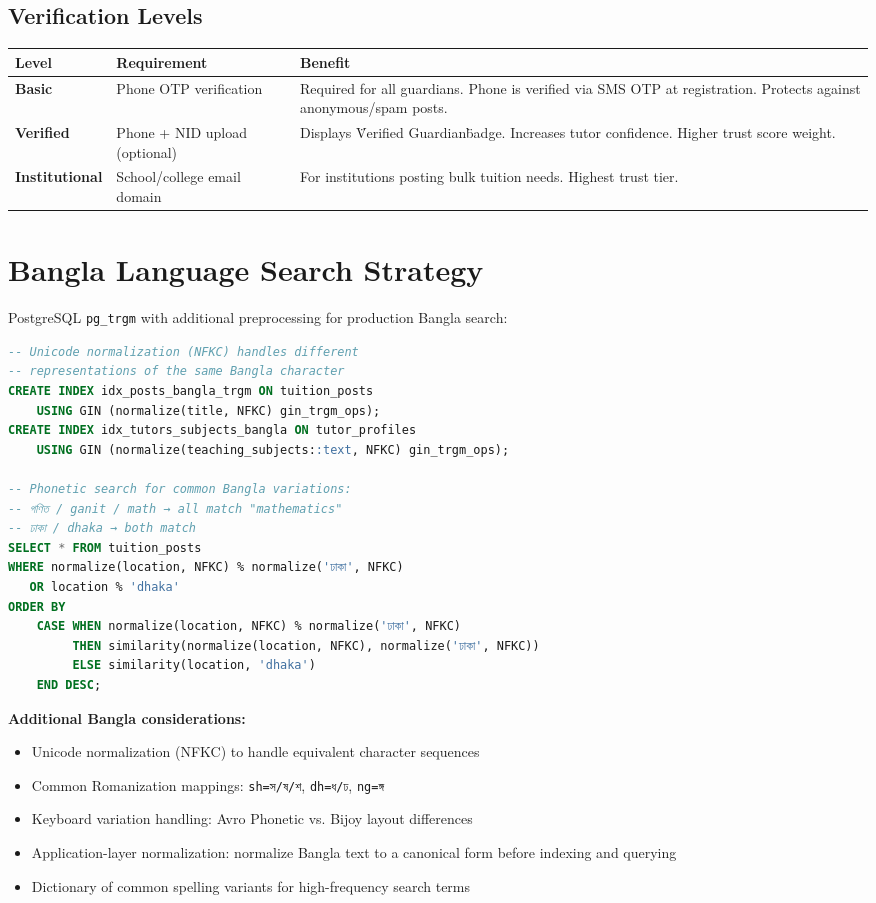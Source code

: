\documentclass[12pt,a4paper,twoside]{report}
\begin{document}
\subsection{Verification Levels}

\begin{longtable}{p{3cm}|p{3cm}|p{7cm}}
\toprule
\textbf{Level} & \textbf{Requirement} & \textbf{Benefit} \\
\midrule
\endhead
\bottomrule
\endfoot
\textbf{Basic} & Phone OTP verification & Required for all guardians. Phone is verified via SMS OTP at registration. Protects against anonymous/spam posts. \\
\textbf{Verified} & Phone + NID upload (optional) & Displays \"Verified Guardian\" badge. Increases tutor confidence. Higher trust score weight. \\
\textbf{Institutional} & School/college email domain & For institutions posting bulk tuition needs. Highest trust tier. \\
\bottomrule
\end{longtable}

\section{Bangla Language Search Strategy}

PostgreSQL \texttt{pg\_trgm} with additional preprocessing for production Bangla search:

\begin{lstlisting}[style=code, language=SQL, caption={Bangla-Aware Fuzzy Search}]
-- Unicode normalization (NFKC) handles different 
-- representations of the same Bangla character
CREATE INDEX idx_posts_bangla_trgm ON tuition_posts 
    USING GIN (normalize(title, NFKC) gin_trgm_ops);
CREATE INDEX idx_tutors_subjects_bangla ON tutor_profiles 
    USING GIN (normalize(teaching_subjects::text, NFKC) gin_trgm_ops);

-- Phonetic search for common Bangla variations:
-- গণিত / ganit / math → all match "mathematics"
-- ঢাকা / dhaka → both match
SELECT * FROM tuition_posts
WHERE normalize(location, NFKC) % normalize('ঢাকা', NFKC)
   OR location % 'dhaka'
ORDER BY 
    CASE WHEN normalize(location, NFKC) % normalize('ঢাকা', NFKC) 
         THEN similarity(normalize(location, NFKC), normalize('ঢাকা', NFKC))
         ELSE similarity(location, 'dhaka')
    END DESC;
\end{lstlisting}

\textbf{Additional Bangla considerations:}
\begin{itemize}
    \item Unicode normalization (NFKC) to handle equivalent character sequences
    \item Common Romanization mappings: \texttt{sh=স/ষ/শ}, \texttt{dh=ধ/ঢ}, \texttt{ng=ঙ্গ}
    \item Keyboard variation handling: Avro Phonetic vs. Bijoy layout differences
    \item Application-layer normalization: normalize Bangla text to a canonical form before indexing and querying
    \item Dictionary of common spelling variants for high-frequency search terms
\end{itemize}
\end{document}
